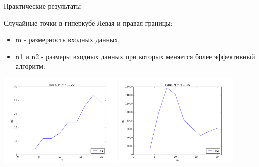 \documentclass{beamer}
\begin{document}
\begin{frame}{Практические результаты}
\begin{block}{Случайные точки в гиперкубе}
Левая и правая границы: 
\begin{itemize}
	\item m - размерность входных данных, 
	\item n1 и n2 - размеры входных данных при которых меняется более эффективный алгоритм.
\end{itemize}
\begin{table}[h]
\begin{center}
\includegraphics[width=6cm]{pic/cube_n1-}
\includegraphics[width=6cm]{pic/cube_n2-}
\end{center}
\end{table}
\end{block}
\end{frame}
\end{document}

